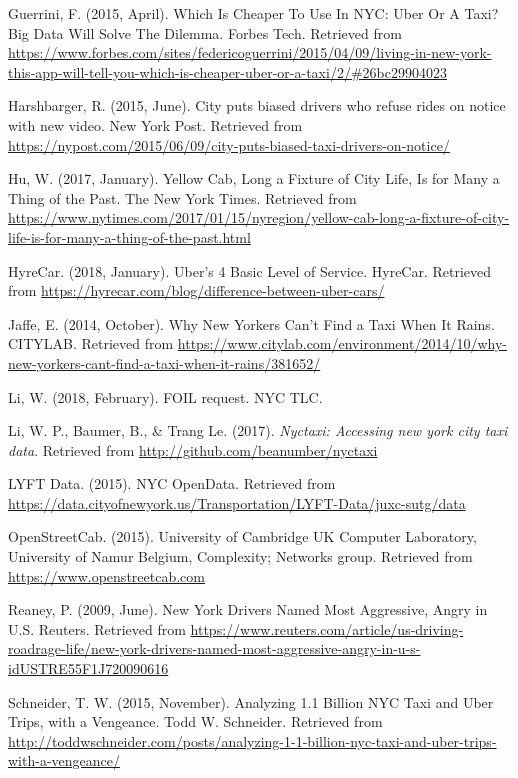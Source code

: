 \documentclass[12pt,twoside]{reedthesis}
\theoremstyle{definition}
\theoremstyle{definition}
\theoremstyle{definition}
\theoremstyle{remark}
\begin{document}
\hypertarget{ref-guerrini2015}{}
Guerrini, F. (2015, April). Which Is Cheaper To Use In NYC: Uber Or A
Taxi? Big Data Will Solve The Dilemma. Forbes Tech. Retrieved from
\url{https://www.forbes.com/sites/federicoguerrini/2015/04/09/living-in-new-york-this-app-will-tell-you-which-is-cheaper-uber-or-a-taxi/2/\#26bc29904023}

\hypertarget{ref-Rebecca2015}{}
Harshbarger, R. (2015, June). City puts biased drivers who refuse rides
on notice with new video. New York Post. Retrieved from
\url{https://nypost.com/2015/06/09/city-puts-biased-taxi-drivers-on-notice/}

\hypertarget{ref-hu2017}{}
Hu, W. (2017, January). Yellow Cab, Long a Fixture of City Life, Is for
Many a Thing of the Past. The New York Times. Retrieved from
\url{https://www.nytimes.com/2017/01/15/nyregion/yellow-cab-long-a-fixture-of-city-life-is-for-many-a-thing-of-the-past.html}

\hypertarget{ref-uberx}{}
HyreCar. (2018, January). Uber's 4 Basic Level of Service. HyreCar.
Retrieved from
\url{https://hyrecar.com/blog/difference-between-uber-cars/}

\hypertarget{ref-citylab}{}
Jaffe, E. (2014, October). Why New Yorkers Can't Find a Taxi When It
Rains. CITYLAB. Retrieved from
\url{https://www.citylab.com/environment/2014/10/why-new-yorkers-cant-find-a-taxi-when-it-rains/381652/}

\hypertarget{ref-foirequest}{}
Li, W. (2018, February). FOIL request. NYC TLC.

\hypertarget{ref-pkgnyctaxi}{}
Li, W. P., Baumer, B., \& Trang Le. (2017). \emph{Nyctaxi: Accessing new
york city taxi data}. Retrieved from
\url{http://github.com/beanumber/nyctaxi}

\hypertarget{ref-datalyft}{}
LYFT Data. (2015). NYC OpenData. Retrieved from
\url{https://data.cityofnewyork.us/Transportation/LYFT-Data/juxc-sutg/data}

\hypertarget{ref-appone}{}
OpenStreetCab. (2015). University of Cambridge UK Computer Laboratory,
University of Namur Belgium, Complexity; Networks group. Retrieved from
\url{https://www.openstreetcab.com}

\hypertarget{ref-reaney2009}{}
Reaney, P. (2009, June). New York Drivers Named Most Aggressive, Angry
in U.S. Reuters. Retrieved from
\url{https://www.reuters.com/article/us-driving-roadrage-life/new-york-drivers-named-most-aggressive-angry-in-u-s-idUSTRE55F1J720090616}

\hypertarget{ref-schneider2015}{}
Schneider, T. W. (2015, November). Analyzing 1.1 Billion NYC Taxi and
Uber Trips, with a Vengeance. Todd W. Schneider. Retrieved from
\url{http://toddwschneider.com/posts/analyzing-1-1-billion-nyc-taxi-and-uber-trips-with-a-vengeance/}
\end{document}
